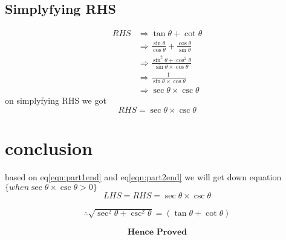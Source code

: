 \documentclass[12pt,twocolumn]{article}
\begin{document}
\subsection*{Simplyfying RHS}
 \begin{align}
  RHS&\Rightarrow \tan{\theta}+\cot{\theta}  \\
     &\Rightarrow  \frac{\sin{\theta}}{\cos{\theta}}+\frac{\cos{\theta}}{\sin{\theta}} \\
     &\Rightarrow \frac{\sin^2{\theta}+\cos^2{\theta}}{\sin{\theta}\times\cos{\theta}}\\
     &\Rightarrow \frac{1}{\sin{\theta}\times\cos{\theta}}\\
     &\Rightarrow \sec{\theta}\times\csc{\theta}
 \end{align}
on simplyfying RHS we got
\begin{equation}
\label{eqn:part2end}
RHS =  \sec{\theta}\times\csc{\theta}
\end{equation}

\section*{conclusion}
 based on eq\ref{eqn:part1end} and eq\ref{eqn:part2end} we will get down equation
 $\{ when\sec{\theta}\times\csc{\theta} >0\}$
 \begin{equation}
 LHS = RHS =   \sec{\theta}\times\csc{\theta}
  \end{equation}
 

\begin{align*}
\therefore\sqrt{\sec^2{\theta}+\csc^2{\theta}}=(\tan{\theta}+\cot{\theta})
\end{align*}


\[\textbf{Hence Proved}\]
\end{document}

